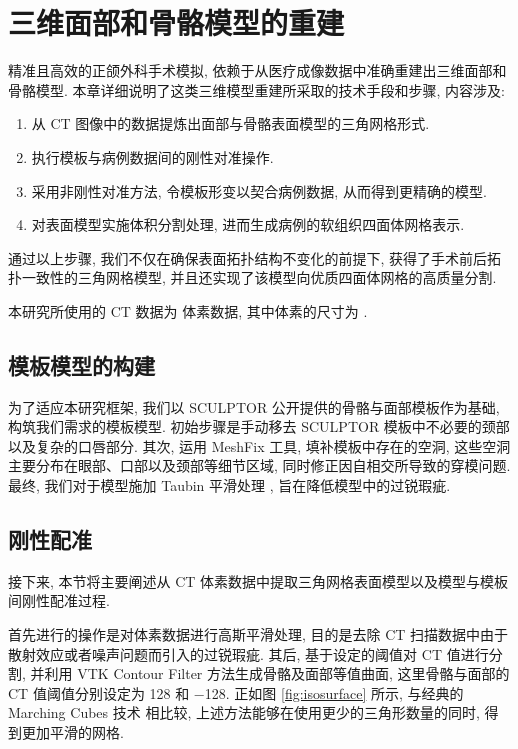 
\chapter{三维面部和骨骼模型的重建}

精准且高效的正颌外科手术模拟, 依赖于从医疗成像数据中准确重建出三维面部和骨骼模型.
本章详细说明了这类三维模型重建所采取的技术手段和步骤, 内容涉及:
\begin{enumerate}
  \item 从 CT 图像中的数据提炼出面部与骨骼表面模型的三角网格形式.
  \item 执行模板与病例数据间的刚性对准操作.
  \item 采用非刚性对准方法, 令模板形变以契合病例数据, 从而得到更精确的模型.
  \item 对表面模型实施体积分割处理, 进而生成病例的软组织四面体网格表示.
\end{enumerate}
通过以上步骤, 我们不仅在确保表面拓扑结构不变化的前提下, 获得了手术前后拓扑一致性的三角网格模型, 并且还实现了该模型向优质四面体网格的高质量分割.

本研究所使用的 CT 数据为  体素数据, 其中体素的尺寸为 .

\section{模板模型的构建}

为了适应本研究框架, 我们以 SCULPTOR \cite{qiuSCULPTORSkeletonconsistentFace2022a} 公开提供的骨骼与面部模板作为基础, 构筑我们需求的模板模型.
初始步骤是手动移去 SCULPTOR 模板中不必要的颈部以及复杂的口唇部分.
其次, 运用 MeshFix \cite{atteneLightweightApproachRepairing2010} 工具, 填补模板中存在的空洞, 这些空洞主要分布在眼部、口部以及颈部等细节区域, 同时修正因自相交所导致的穿模问题.
最终, 我们对于模型施加 Taubin 平滑处理 \cite{vollmerImprovedLaplacianSmoothing1999}, 旨在降低模型中的过锐瑕疵.

\section{刚性配准}

接下来, 本节将主要阐述从 CT 体素数据中提取三角网格表面模型以及模型与模板间刚性配准过程.

首先进行的操作是对体素数据进行高斯平滑处理, 目的是去除 CT 扫描数据中由于散射效应或者噪声问题而引入的过锐瑕疵.
其后, 基于设定的阈值对 CT 值进行分割, 并利用 VTK Contour Filter 方法生成骨骼及面部等值曲面, 这里骨骼与面部的 CT 值阈值分别设定为 \num{128} 和 \num{-128}.
正如图 \ref{fig:isosurface} 所示, 与经典的 Marching Cubes 技术 \cite{lorensenMarchingCubesHigh1998} 相比较, 上述方法能够在使用更少的三角形数量的同时, 得到更加平滑的网格.


